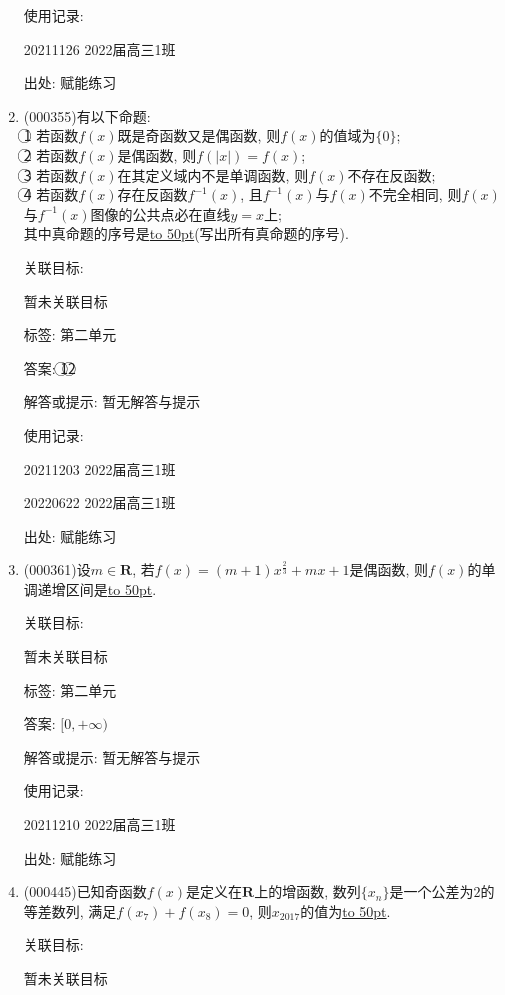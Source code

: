 \documentclass[10pt,a4paper]{article}
\newcommand{\blank}[1]{\underline{\hbox to #1pt{}}}
\begin{document}
\begin{enumerate}[1.]
使用记录:

20211126	2022届高三1班	


出处: 赋能练习
\item { (000355)}有以下命题:\\
\textcircled{1} 若函数$f(x)$既是奇函数又是偶函数, 则$f(x)$的值域为$\{0\}$; \\
\textcircled{2} 若函数$f(x)$是偶函数, 则$f(|x|)=f(x)$;\\
\textcircled{3} 若函数$f(x)$在其定义域内不是单调函数, 则$f(x)$不存在反函数;\\
\textcircled{4} 若函数$f(x)$存在反函数${{f}^{-1}}(x)$, 且${{f}^{-1}}(x)$与$f(x)$不完全相同, 则$f(x)$与${{f}^{-1}}(x)$图像的公共点必在直线$y=x$上; \\
其中真命题的序号是\blank{50}(写出所有真命题的序号).


关联目标:

暂未关联目标



标签: 第二单元

答案: \textcircled{1}\textcircled{2}

解答或提示: 暂无解答与提示

使用记录:

20211203	2022届高三1班	

20220622	2022届高三1班  	


出处: 赋能练习
\item { (000361)}设$m\in \mathbf{R}$, 若$f(x)=(m+1)x^{\tfrac{2}{3}}+mx+1$是偶函数, 则$f(x)$的单调递增区间是\blank{50}.


关联目标:

暂未关联目标



标签: 第二单元

答案: $[0,+\infty)$

解答或提示: 暂无解答与提示

使用记录:

20211210	2022届高三1班	


出处: 赋能练习
\item { (000445)}已知奇函数$f(x)$是定义在$\mathbf{R}$上的增函数, 数列$\{x_n\}$是一个公差为$2$的等差数列, 满足$f(x_7)+f(x_8)=0$, 则$x_{2017}$的值为\blank{50}.


关联目标:

暂未关联目标




\end{enumerate}
\end{document}
